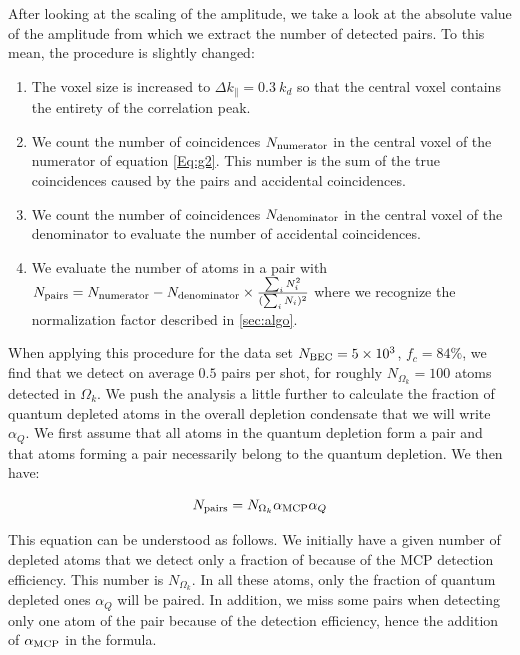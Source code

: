After looking at the scaling of the amplitude, we take a look at the absolute value of the amplitude from which we extract the number of detected \kmk pairs. To this mean, the procedure is slightly changed:

\begin{enumerate}
    \item The voxel size is increased to $\Delta k_{\parallel} = 0.3 \ k_d$ so that the central voxel contains the entirety of the correlation peak.
    \item We count the number of coincidences $N_{\rm{numerator}}$ in the central voxel of the numerator of equation \ref{Eq:g2}. This number is the sum of the true coincidences caused by the \kmk pairs and accidental coincidences.
    \item  We count the number of coincidences $N_{\rm{denominator}}$ in the central voxel of the denominator to evaluate the number of accidental coincidences.
    \item We evaluate the number of atoms in a \kmk pair with $N_{\rm{pairs}}=N_{\rm{numerator}} - N_{\rm{denominator}} \times \frac{\sum_i N_i^2}{(\sum_i N_i)^2}$ where we recognize the normalization factor described in \ref{sec:algo}.
\end{enumerate}

When applying this procedure for the data set $N_{\rm{BEC}}=5 \times 10^3$, $f_c=84 \%$, we find that we detect on average $0.5$ pairs per shot, for roughly $N_{\Omega_k}=100$ atoms detected in $\Omega_k$. We push the analysis a little further to calculate the fraction of quantum depleted atoms in the overall depletion condensate that we will write $\alpha_Q$. We first assume that all atoms in the quantum depletion form a \kmk pair and that atoms forming a \kmk pair necessarily belong to the quantum depletion. We then have:

\begin{equation}
    N_{\rm{pairs}}= N_{\Omega_k} \alpha_{\rm{MCP}} \alpha_Q
    \label{eq:Npairs}
\end{equation}

This equation can be understood as follows. We initially have a given number of depleted atoms that we detect only a fraction of because of the MCP detection efficiency. This number is $N_{\Omega_k}$. In all these atoms, only the fraction of quantum depleted ones $\alpha_Q$ will be \kmk paired. In addition, we miss some pairs when detecting only one atom of the pair because of the detection efficiency, hence the addition of $\alpha_{\rm{MCP}}$ in the formula.

